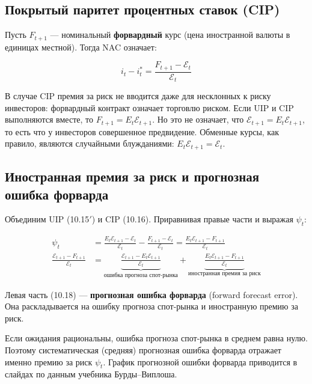 \documentclass[10pt,a4paper]{article}
\begin{document}
\subsection{Покрытый паритет процентных ставок (CIP)}

Пусть $F_{t+1}$ — номинальный \textbf{форвардный} курс (цена иностранной валюты в единицах местной). Тогда NAC означает:
\begin{formulabox}
\begin{equation}
i_t - i^{*}_t = \frac{F_{t+1}-\mathcal{E}_t}{\mathcal{E}_t} \tag{10.16}
\end{equation}
\end{formulabox}

\begin{intuition}
В случае CIP премия за риск не вводится даже для несклонных к риску инвесторов: форвардный контракт означает торговлю риском. Если UIP и CIP выполняются вместе, то $F_{t+1}=E_t\mathcal{E}_{t+1}$. Но это не означает, что $\mathcal{E}_{t+1}=E_t\mathcal{E}_{t+1}$, то есть что у инвесторов совершенное предвидение. Обменные курсы, как правило, являются случайными блужданиями: $E_t\mathcal{E}_{t+1}=\mathcal{E}_t$.
\end{intuition}

\subsection{Иностранная премия за риск и прогнозная ошибка форварда}

Объединим UIP (10.15$'$) и CIP (10.16). Приравнивая правые части и выражая $\psi_t$:
\begin{formulabox}
\begin{align}
\psi_t &= \frac{E_t\mathcal{E}_{t+1}-\mathcal{E}_t}{\mathcal{E}_t} - \frac{F_{t+1}-\mathcal{E}_t}{\mathcal{E}_t} = \frac{E_t\mathcal{E}_{t+1}-F_{t+1}}{\mathcal{E}_t} \tag{10.17}\\
\frac{\mathcal{E}_{t+1}-F_{t+1}}{\mathcal{E}_t} &= \underbrace{\frac{\mathcal{E}_{t+1}-E_t\mathcal{E}_{t+1}}{\mathcal{E}_t}}_{\text{ошибка прогноза спот-рынка}} + \underbrace{\frac{E_t\mathcal{E}_{t+1}-F_{t+1}}{\mathcal{E}_t}}_{\text{иностранная премия за риск}} \tag{10.18}
\end{align}
\end{formulabox}
Левая часть (10.18) — \textbf{прогнозная ошибка форварда} (forward forecast error). Она раскладывается на ошибку прогноза спот-рынка и иностранную премию за риск.

\begin{intuition}
Если ожидания рациональны, ошибка прогноза спот-рынка в среднем равна нулю. Поэтому систематическая (средняя) прогнозная ошибка форварда отражает именно премию за риск $\psi_t$. График прогнозной ошибки форварда приводится в слайдах по данным учебника Бурды--Виплоша.
\end{intuition}
\end{document}
